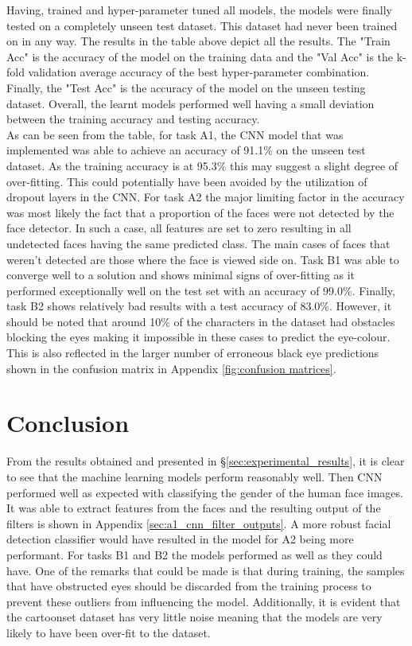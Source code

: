 \documentclass{article}
\begin{document}
    Having, trained and hyper-parameter tuned all models, the models were finally tested on a completely unseen test dataset. This dataset had never been trained on in any way. The results in the table above depict all the results. The "Train Acc" is the accuracy of the model on the training data and the "Val Acc" is the k-fold validation average accuracy of the best hyper-parameter combination. Finally, the "Test Acc" is the accuracy of the model on the unseen testing dataset. Overall, the learnt models performed well having a small deviation between the training accuracy and testing accuracy.
    \\
    
    As can be seen from the table, for task A1, the CNN model that was implemented was able to achieve an accuracy of 91.1\% on the unseen test dataset. As the training accuracy is at 95.3\% this may suggest a slight degree of over-fitting. This could potentially have been avoided by the utilization of dropout layers in the CNN. For task A2 the major limiting factor in the accuracy was most likely the fact that a proportion of the faces were not detected by the face detector. In such a case, all features are set to zero resulting in all undetected faces having the same predicted class. The main cases of faces that weren't detected are those where the face is viewed side on. Task B1 was able to converge well to a solution and shows minimal signs of over-fitting as it performed exceptionally well on the test set with an accuracy of 99.0\%. Finally, task B2 shows relatively bad results with a test accuracy of 83.0\%. However, it should be noted that around 10\% of the characters in the dataset had obstacles blocking the eyes making it impossible in these cases to predict the eye-colour. This is also reflected in the larger number of erroneous black eye predictions shown in the confusion matrix in Appendix \ref{fig:confusion matrices}.
    

\section{Conclusion}
\label{sec:conclusion}
    From the results obtained and presented in \S \ref{sec:experimental_results}, it is clear to see that the machine learning models perform reasonably well. Then CNN performed well as expected with classifying the gender of the human face images. It was able to extract features from the faces and the resulting output of the filters is shown in Appendix \ref{sec:a1_cnn_filter_outputs}. A more robust facial detection classifier would have resulted in the model for A2 being more performant. For tasks B1 and B2 the models performed as well as they could have. One of the remarks that could be made is that during training, the samples that have obstructed eyes should be discarded from the training process to prevent these outliers from influencing the model. Additionally, it is evident that the cartoonset dataset has very little noise meaning that the models are very likely to have been over-fit to the dataset. 
\end{document}
